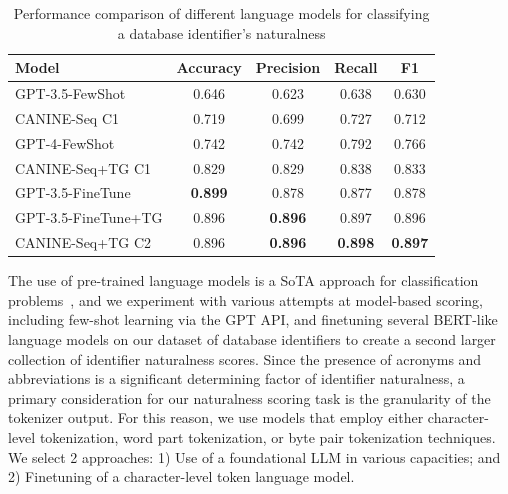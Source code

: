 \begin{table}[t]
  \centering
  \caption{Performance comparison of different language models for classifying a database identifier's naturalness}
  \begin{tabular}{p{4cm}|cccc}
  \toprule
  \textbf{Model} & \textbf{Accuracy} & \textbf{Precision} & \textbf{Recall} & \textbf{F1} \\
  \midrule
  GPT-3.5-FewShot & 0.646 & 0.623 & 0.638 & 0.630 \\
  CANINE-Seq C1 & 0.719 & 0.699 & 0.727 & 0.712 \\
  GPT-4-FewShot & 0.742 & 0.742 & 0.792 & 0.766 \\
  CANINE-Seq+TG C1 & 0.829 & 0.829 & 0.838 & 0.833 \\
  GPT-3.5-FineTune & \textbf{0.899} & 0.878 & 0.877 & 0.878 \\
  GPT-3.5-FineTune+TG & 0.896 & \textbf{0.896} & 0.897 & 0.896 \\
  CANINE-Seq+TG C2 & 0.896 & \textbf{0.896} & \textbf{0.898} & \textbf{0.897} \\
  \bottomrule
  \end{tabular}
  \label{table:classifierperformance}
\end{table}

The use of pre-trained language models is a SoTA approach for classification problems~\cite{10.1145/3605943}, and we experiment with various attempts at model-based scoring, including few-shot learning via the GPT API, and finetuning several BERT-like language models on our dataset of database identifiers to create a second larger collection of identifier naturalness scores. 
Since the presence of acronyms and abbreviations is a significant determining factor of identifier naturalness, a primary consideration for our naturalness scoring task is the granularity of the tokenizer output.
For this reason, we use models that employ either character-level tokenization, word part tokenization, or byte pair tokenization techniques.
We select 2 approaches: 1) Use of a foundational LLM in various capacities; and 2) Finetuning of a character-level token language model.

